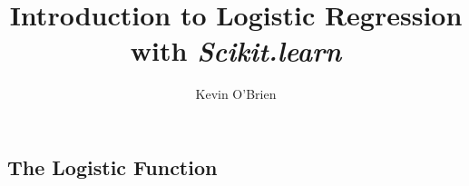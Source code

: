 \documentclass[12pt]{article}
\begin{document}
\author{Kevin O'Brien}
\title{Introduction to Logistic Regression with \textbf{\textit{Scikit.learn}}}
\large
\tableofcontents
\newpage

\subsection{The Logistic Function}
\end{document}
